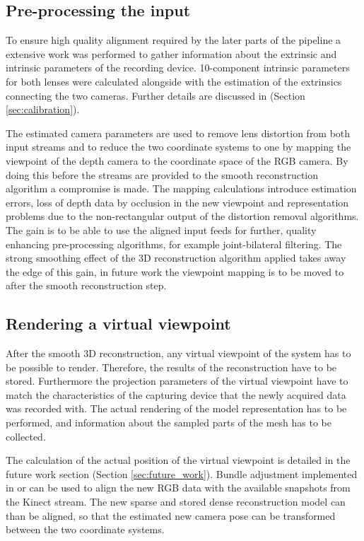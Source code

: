 \documentclass{ucl_thesis}
\newcommand{\secref}[1]{(Section \ref{#1})}
\begin{document}
\subsection{Pre-processing the input}

\par To ensure high quality alignment required by the later parts of the pipeline a extensive work was performed to gather information about the extrinsic and intrinsic parameters of the recording device. 10-component intrinsic parameters for both lenses were calculated alongside with the estimation of the extrinsics connecting the two cameras. Further details are discussed in \secref{sec:calibration}.

\par The estimated camera parameters are used to remove lens distortion from both input streams and to reduce the two coordinate systems to one by mapping the viewpoint of the depth camera to the coordinate space of the RGB camera. By doing this before the streams are provided to the smooth reconstruction algorithm a compromise is made. The mapping calculations introduce estimation errors, loss of depth data by occlusion in the new viewpoint and representation problems due to the non-rectangular output of the distortion removal algorithms. The gain is to be able to use the aligned input feeds for further, quality enhancing pre-processing algorithms, for example joint-bilateral filtering. The strong smoothing effect of the 3D reconstruction algorithm applied takes away the edge of this gain, in future work the viewpoint mapping is to be moved to after the smooth reconstruction step.

\subsection{Rendering a virtual viewpoint}

\par After the smooth 3D reconstruction, any virtual viewpoint of the system has to be possible to render. Therefore, the results of the reconstruction have to be stored. Furthermore the projection parameters of the virtual viewpoint have to match the characteristics of the capturing device that the newly acquired data was recorded with. The actual rendering of the model representation has to be performed, and information about the sampled parts of the mesh has to be collected.

\par The calculation of the actual position of the virtual viewpoint is detailed in the future work section \secref{sec:future_work}. Bundle adjustment implemented in \citep{SnavelySS06} or \citep{vsfm} can be used to align the new RGB data with the available snapshots from the Kinect stream. The new sparse and stored dense reconstruction model can than be aligned, so that the estimated new camera pose can be transformed between the two coordinate systems.
\end{document}
